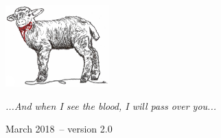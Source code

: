 \documentclass[10pt,oneside,footinclude=true,headinclude=true]{scrbook} %
\begin{document}
\begin{titlepage}
\begin{center}
\large \hfill \vfill

\begingroup
\color{RoyalPurple} \\
\bigskip
\color{RoyalPurple} \\ %
\bigskip
\endgroup

\bigskip\bigskip
\bigskip\bigskip
\bigskip\bigskip
\bigskip
\includegraphics[width=4cm]{lamb3nooval} \\
\bigskip
\bigskip\bigskip
\bigskip\bigskip
\bigskip\bigskip

\textit{...And when I see the blood, I will pass over you...} \\ \medskip %

March 2018\ -- version 2.0 %

\vfill
\end{center}
\end{titlepage}
    

\end{document}
